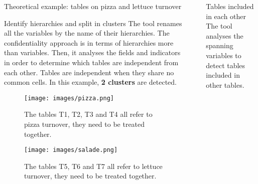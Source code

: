 \documentclass[final]{beamer}
\newlength{\sepwidth}
\newlength{\colwidth}
\newcommand{\separatorcolumn}{\begin{column}{\sepwidth}\end{column}}
\begin{document}
\begin{frame}[fragile]
\begin{columns}[t]
\begin{column}{\colwidth}
\begin{block}{Theoretical example: tables on pizza and lettuce turnover}
  \end{block}

  \begin{block}{Identify hierarchies and split in clusters}
      The tool renames all the variables by the name of their hierarchies. The confidentiality approach is in terms of hierarchies more than variables. Then, it analyses the fields and indicators in order to determine which tables are independent from each other. Tables are independent when they share no common cells. In this example, \textbf{2 clusters} are detected.
    
    \vspace{0.7cm}
    
    \begin{figure}[ht]
    \centering
    \begin{minipage}{0.48\textwidth}  %
        \centering
        \texttt{[image: images/pizza.png]}
        \vspace{0.6cm}
        
        The tables T1, T2, T3 and T4 all refer to pizza turnover, they need to be treated together.
    \end{minipage}%
    \hfill
    \begin{minipage}{0.48\textwidth}  %
        \centering
        \texttt{[image: images/salade.png]}
        \vspace{0.3cm}
        
        The tables T5, T6 and T7 all refer to lettuce turnover, they need to be treated together.
    \end{minipage}
    \end{figure}

      
  \end{block}

\end{column} %

\separatorcolumn

\begin{column}{\colwidth}

  \begin{block}{Tables included in each other}
    The tool analyses the spanning variables to detect tables included in other tables.
  

\end{block}
\end{column}
\end{columns}
\end{frame}
\end{document}
